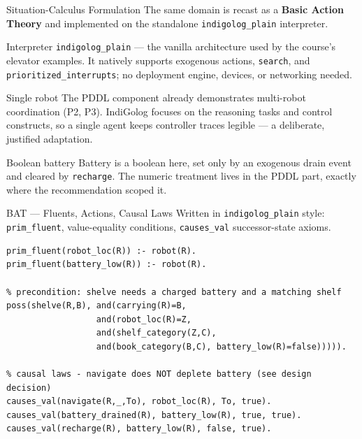 \documentclass{beamer}
\begin{document}
\begin{frame}{Situation-Calculus Formulation}
\footnotesize
The same domain is recast as a \textbf{Basic Action Theory} and implemented on
the standalone \texttt{indigolog\_plain} interpreter.

\vspace{-0.4em}
\begin{block}{Interpreter}
\texttt{indigolog\_plain} --- the vanilla architecture used by the course's
elevator examples. It natively supports exogenous actions, \texttt{search},
and \texttt{prioritized\_interrupts}; no deployment engine, devices, or
networking needed.
\end{block}
\vspace{-0.6em}
\begin{block}{Single robot}
The PDDL component already demonstrates multi-robot coordination (P2, P3).
IndiGolog focuses on the reasoning tasks and control constructs, so a single
agent keeps controller traces legible --- a deliberate, justified adaptation.
\end{block}
\vspace{-0.6em}
\begin{block}{Boolean battery}
Battery is a boolean here, set only by an exogenous drain event and cleared by
\texttt{recharge}. The numeric treatment lives in the PDDL part, exactly where
the recommendation scoped it.
\end{block}
\end{frame}

\begin{frame}[fragile]{BAT --- Fluents, Actions, Causal Laws}
Written in \texttt{indigolog\_plain} style: \texttt{prim\_fluent},
value-equality conditions, \texttt{causes\_val} successor-state axioms.

\vspace{0.1em}
\begin{lstlisting}[basicstyle=\ttfamily\scriptsize]
% fluents (boolean modelled as value-equality, never bare atoms)
prim_fluent(robot_loc(R)) :- robot(R).
prim_fluent(battery_low(R)) :- robot(R).

% precondition: shelve needs a charged battery and a matching shelf
poss(shelve(R,B), and(carrying(R)=B,
                  and(robot_loc(R)=Z,
                  and(shelf_category(Z,C),
                  and(book_category(B,C), battery_low(R)=false))))).

% causal laws - navigate does NOT deplete battery (see design decision)
causes_val(navigate(R,_,To), robot_loc(R), To, true).
causes_val(battery_drained(R), battery_low(R), true, true).
causes_val(recharge(R), battery_low(R), false, true).
\end{lstlisting}
\end{frame}
\end{document}
